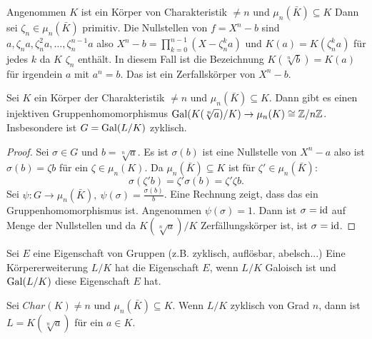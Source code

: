 \begin{Bem}
    Angenommen $K$ ist ein Körper von Charakteristik $\neq n$ und $\mu_n(\bar K)\subseteq K$ Dann sei $\zeta_n\in\mu_n(\bar K)$ primitiv.
    Die Nullstellen von $f=X^n-b$ sind $a,\zeta_na,\zeta_n^2a,\dots,\zeta_n^{n-1}a$ also 
    $X^n-b=\prod\limits_{k=0}^{n-1}(X-\zeta_n^ka)$ und $K(a)=K(\zeta_n^ka)$ für jedes $k$ da $K$ $\zeta_n$ enthält. In diesem Fall ist die Bezeichnung $K(\sqrt[n]{b})=K(a)$ für irgendein $a$ mit $a^n=b$. Das ist ein Zerfallskörper von $X^n-b$.
\end{Bem}
\begin{Lemma}\label{Lem:EinfRadZykl}
    Sei $K$ ein Körper der Charakteristik $\neq n$ und $\mu_n(\bar K)\subseteq K$. Dann gibt es einen injektiven Gruppenhomomorphismus $\operatorname{Gal}(K(\sqrt[n]{a})/K)\to \mu_n(K)\cong \mathbb{Z}/n\mathbb{Z}$. Insbesondere ist $G=\operatorname{Gal}(L/K)$ zyklisch.
\end{Lemma}
\begin{proof}
    Sei $\sigma\in G$ und $b=\sqrt[n]{a}$. Es ist $\sigma(b)$ ist eine Nullstelle von $X^n-a$ also ist $\sigma(b)=\zeta b$ für ein $\zeta\in\mu_n(K)$.
    Da $\mu_n(\bar K)\subseteq K$ ist für $\zeta'\in\mu_n(\bar K):$
    $$\sigma(\zeta'b)=\zeta'\sigma(b)=\zeta'\zeta b.$$
    Sei $\psi\colon G\to \mu_n(\bar K), \ \psi(\sigma)=\frac{\sigma(b)}{b}$. Eine Rechnung zeigt, dass das ein Gruppenhomomorphismus ist. Angenommen $\psi(\sigma)=1$.
    Dann ist $\sigma=\mathrm{id}$ auf Menge der Nullstellen und da $K(\sqrt[n]{a})/K$ Zerfällungskörper ist, ist $\sigma=\mathrm{id}$.
\end{proof}
\begin{Def}
    Sei $E$ eine Eigenschaft von Gruppen (z.B. zyklisch, auflösbar, abelsch...) Eine Körpererweiterung $L/K$ hat die Eigenschaft $E$, wenn $L/K$ Galoisch ist und $\operatorname{Gal}(L/K)$ diese Eigenschaft $E$ hat.
\end{Def}
\begin{Satz}\label{Satz:ZyklWurzel}
    Sei $Char(K)\neq n$ und $\mu_n(\bar K)\subseteq K$. Wenn $L/K$ zyklisch von Grad $n$, dann ist $L=K(\sqrt[n]{a})$ für ein $a\in K$.
\end{Satz}
